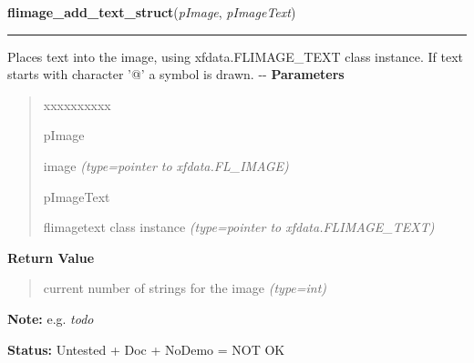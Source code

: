     \vspace{0.5ex}

\hspace{.8\funcindent}\begin{boxedminipage}{\funcwidth}

    \raggedright \textbf{flimage\_add\_text\_struct}(\textit{pImage}, \textit{pImageText})

    \vspace{-1.5ex}

    \rule{\textwidth}{0.5\fboxrule}
\setlength{\parskip}{2ex}

Places text into the image, using xfdata.FLIMAGE\_TEXT class instance.
If text starts with character '@' a symbol is drawn.
-{}-
\setlength{\parskip}{1ex}
      \textbf{Parameters}
      \vspace{-1ex}

      \begin{quote}
        \begin{Ventry}{xxxxxxxxxx}

          \item[pImage]


image
            {\it (type=pointer to xfdata.FL\_IMAGE)}

          \item[pImageText]


flimagetext class instance
            {\it (type=pointer to xfdata.FLIMAGE\_TEXT)}

        \end{Ventry}

      \end{quote}

      \textbf{Return Value}
    \vspace{-1ex}

      \begin{quote}

current number of strings for the image
      {\it (type=int)}

      \end{quote}

\textbf{Note:} 
e.g. \emph{todo}


\textbf{Status:} 
Untested + Doc + NoDemo = NOT OK


    \end{boxedminipage}

    \label{xformslib:flflimage:flimage_delete_all_text}

